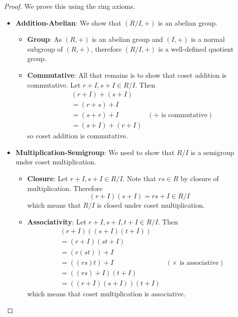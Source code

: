 \begin{proof}
    We prove this using the ring axioms.
    \begin{itemize}
        \item \textbf{Addition-Abelian}: We show that $(R/I,+)$ is an abelian group.
        \begin{itemize}
            \item \textbf{Group}: As $(R,+)$ is an abelian group and $(I,+)$ is a normal subgroup of $(R,+)$, therefore $(R/I,+)$ is a well-defined quotient group.
            \item \textbf{Commutative}: All that remains is to show that coset addition is commutative. Let $r+I, s+I \in R/I$. Then
            \begin{align*}
                &(r+I) + (s+I)\\
                &= (r+s)+I\\
                &= (s+r) + I & (+ \text{ is commutative})\\
                &= (s+I) + (r+I)
            \end{align*}
            so coset addition is commutative.
        \end{itemize}
        \item \textbf{Multiplication-Semigroup}: We need to show that $R/I$ is a semigroup under coset multiplication.
        \begin{itemize}
            \item \textbf{Closure}: Let $r+I, s+I \in R/I$. Note that $rs \in R$ by closure of multiplication. Therefore
            \[
                (r+I)(s+I) = rs+I \in R/I
            \]
            which means that $R/I$ is closed under coset multiplication.

            \item \textbf{Associativity}: Let $r+I, s+I, t+I \in R/I$. Then
            \begin{align*}
                &(r+I)((s+I)(t+I))\\
                &= (r+I)(st+I)\\
                &= (r(st))+I\\
                &= ((rs)t) + I & (\times \text{ is associative})\\
                &= ((rs)+I)(t+I)\\
                &= ((r+I)(s+I))(t+I)
            \end{align*}
            which means that coset multiplication is associative.


\end{itemize}
\end{itemize}
\end{proof}
